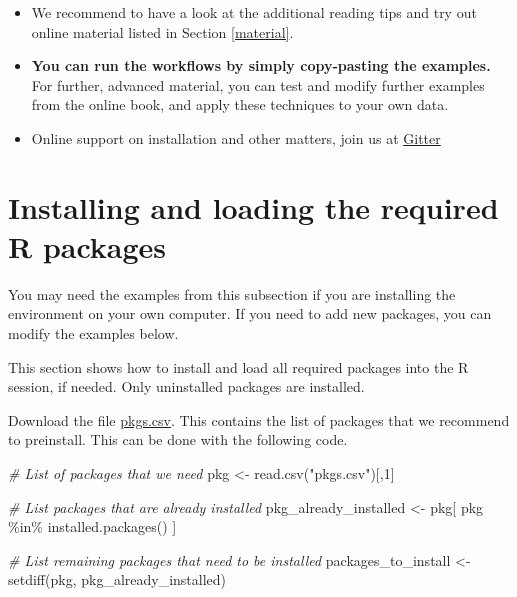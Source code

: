 \documentclass[
  oneside]{book}
\newenvironment{Shaded}{\begin{snugshade}}{\end{snugshade}}
\newcommand{\CommentTok}[1]{\textcolor[rgb]{0.56,0.35,0.01}{\textit{#1}}}
\newcommand{\DecValTok}[1]{\textcolor[rgb]{0.00,0.00,0.81}{#1}}
\newcommand{\FunctionTok}[1]{\textcolor[rgb]{0.00,0.00,0.00}{#1}}
\newcommand{\NormalTok}[1]{#1}
\newcommand{\OtherTok}[1]{\textcolor[rgb]{0.56,0.35,0.01}{#1}}
\newcommand{\SpecialCharTok}[1]{\textcolor[rgb]{0.00,0.00,0.00}{#1}}
\newcommand{\StringTok}[1]{\textcolor[rgb]{0.31,0.60,0.02}{#1}}
\begin{document}
\begin{itemize}
\item
  We recommend to have a look at the additional reading tips and try out online material listed in Section \ref{material}.
\item
  \textbf{You can run the workflows by simply copy-pasting the examples.}
  For further, advanced material, you can test and modify further
  examples from the online book, and apply these techniques to your own
  data.
\item
  Online support on installation and other matters, join us at \href{https://gitter.im/microbiome/miaverse?utm_source=badge\&utm_medium=badge\&utm_campaign=pr-badge\&utm_content=badge}{Gitter}
\end{itemize}

\hypertarget{packages}{%
\section{Installing and loading the required R packages}\label{packages}}

You may need the examples from this subsection if you are installing
the environment on your own computer. If you need to add new packages,
you can modify the examples below.

This section shows how to install and load all required packages into
the R session, if needed. Only uninstalled packages are installed.

Download the file \url{pkgs.csv}. This contains the list of
packages that we recommend to preinstall. This can be done with the
following code.

\begin{Shaded}
\begin{Highlighting}[]
\CommentTok{\# List of packages that we need}
\NormalTok{pkg }\OtherTok{\textless{}{-}} \FunctionTok{read.csv}\NormalTok{(}\StringTok{"pkgs.csv"}\NormalTok{)[,}\DecValTok{1}\NormalTok{]}

\CommentTok{\# List packages that are already installed}
\NormalTok{pkg\_already\_installed }\OtherTok{\textless{}{-}}\NormalTok{ pkg[ pkg }\SpecialCharTok{\%in\%} \FunctionTok{installed.packages}\NormalTok{() ]}

\CommentTok{\# List remaining packages that need to be installed}
\NormalTok{packages\_to\_install }\OtherTok{\textless{}{-}} \FunctionTok{setdiff}\NormalTok{(pkg, pkg\_already\_installed)}
\end{Highlighting}
\end{Shaded}
\end{document}
